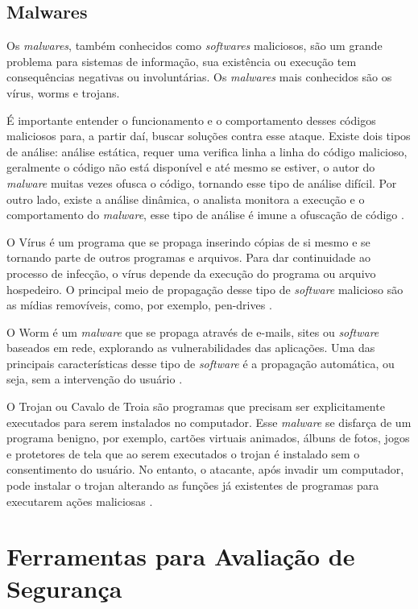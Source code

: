  \subsection{Malwares} \label{sec:malwares}

 Os \textit{malwares}, também conhecidos como \textit{softwares} maliciosos, são um grande problema para sistemas de informação, sua existência ou execução tem consequências negativas ou involuntárias. Os \textit{malwares} mais conhecidos são os vírus, worms e trojans.

 É importante entender o funcionamento e o comportamento desses códigos maliciosos para, a partir daí, buscar soluções contra esse ataque. Existe dois tipos de análise: análise estática, requer uma verifica linha a linha do código malicioso, geralmente o código não está disponível e até mesmo se estiver, o autor do \textit{malware} muitas vezes ofusca o código, tornando esse tipo de análise difícil. Por outro lado, existe a análise dinâmica, o analista monitora a execução e o comportamento do \textit{malware}, esse tipo de análise é imune a ofuscação de código \cite{encycrypt}.

 O Vírus é um programa que se propaga inserindo cópias de si mesmo e se tornando parte de outros programas e arquivos. Para dar continuidade ao processo de infecção, o vírus depende da execução do programa ou arquivo hospedeiro. O principal meio de propagação desse tipo de \textit{software} malicioso são as mídias removíveis, como, por exemplo, pen-drives \cite{certs-malwares}.

O Worm é um \textit{malware} que se propaga através de e-mails, sites ou \textit{software} baseados em rede, explorando as vulnerabilidades das aplicações. Uma das principais características desse tipo de \textit{software} é a propagação automática, ou seja, sem a intervenção do usuário \cite{detectingworm}. 

O Trojan ou Cavalo de Troia são programas que precisam ser explicitamente executados para serem instalados no computador. Esse \textit{malware} se disfarça de um programa benigno, por exemplo, cartões virtuais animados, álbuns de fotos, jogos e protetores de tela que ao serem executados o trojan é instalado sem o consentimento do usuário. No entanto, o atacante, após invadir um computador, pode instalar o trojan  alterando as funções já existentes de programas para executarem ações maliciosas \cite{certs-malwares}.

 \section{Ferramentas para Avaliação de Segurança} \label{sec:ferramentas}

